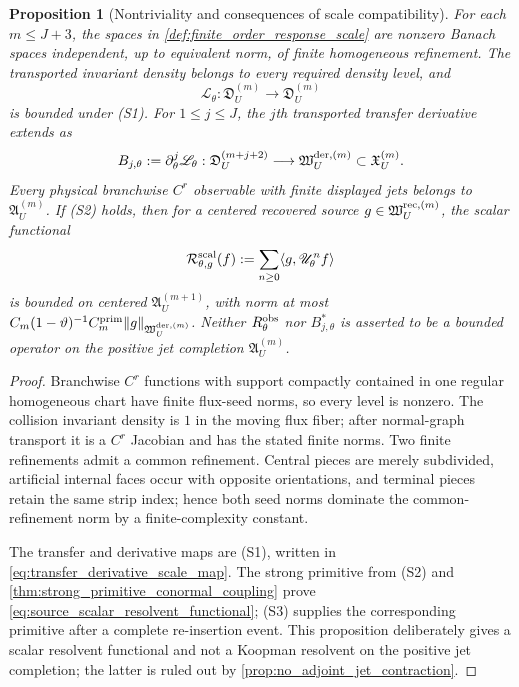 \documentclass[11pt]{amsart}
\theoremstyle{compactplain}
\newtheorem{proposition}[theorem]{Proposition}
\theoremstyle{compactdefinition}
\theoremstyle{compactremark}
\newcommand{\Ltransfer}{\mathscr L}
\begin{document}
\begin{proposition}[Nontriviality and consequences of scale compatibility]
\label{prop:response_scale_well_posed}
For each \(m\le J+3\), the spaces in
\cref{def:finite_order_response_scale} are nonzero Banach spaces independent,
up to equivalent norm, of finite homogeneous refinement.  The transported
invariant density belongs to every required density level, and
\[
  \Ltransfer_\theta:
  \mathfrak D_U^{(m)}\longrightarrow\mathfrak D_U^{(m)}
\]
is bounded under (S1).  For \(1\le j\le J\), the \(j\)th transported transfer derivative
extends as
\begin{equation}
\label{eq:transfer_derivative_scale_map}
  B_{j,\theta}:=\partial_\theta^j\Ltransfer_\theta:
  \mathfrak D_U^{(m+j+2)}
  \longrightarrow
  \mathfrak W_U^{{\rm der},(m)}
  \subset\mathfrak X_U^{(m)} .
\end{equation}
Every physical branchwise \(C^r\) observable with finite displayed jets belongs
to \(\mathfrak A_U^{(m)}\).  If (S2) holds, then for a centered recovered source
\(g\in\mathfrak W_U^{{\rm rec},(m)}\), the scalar functional
\begin{equation}
\label{eq:source_scalar_resolvent_functional}
  \mathcal R_{\theta,g}^{\rm scal}(f)
  :=\sum_{n\ge0}\langle g,\mathscr U_\theta^nf\rangle
\end{equation}
is bounded on centered \(\mathfrak A_U^{(m+1)}\), with norm at most
\(C_m(1-\vartheta)^{-1}C_m^{\rm prim}
  \|g\|_{\mathfrak W_U^{{\rm der},(m)}}\).
Neither \(R_\theta^{\rm obs}\) nor \(B_{j,\theta}^*\) is asserted to be a
bounded operator on the positive jet completion \(\mathfrak A_U^{(m)}\).
\end{proposition}

\begin{proof}
Branchwise \(C^r\) functions with support compactly contained in one regular
homogeneous chart have finite flux-seed norms, so every level is nonzero.  The
collision invariant density is \(1\) in the moving flux fiber; after
normal-graph transport it is a \(C^r\) Jacobian and has the stated finite
norms.  Two finite refinements admit a common refinement.  Central pieces are
merely subdivided, artificial internal faces occur with opposite orientations,
and terminal pieces retain the same strip index; hence both seed norms
dominate the common-refinement norm by a finite-complexity constant.

The transfer and derivative maps are (S1), written in
\eqref{eq:transfer_derivative_scale_map}.  The strong primitive from (S2) and
\cref{thm:strong_primitive_conormal_coupling} prove
\eqref{eq:source_scalar_resolvent_functional}; (S3) supplies the corresponding
primitive after a complete re-insertion event.  This proposition deliberately gives a scalar resolvent functional and
not a Koopman resolvent on the positive jet completion; the latter is ruled out
by \cref{prop:no_adjoint_jet_contraction}.
\end{proof}
\end{document}
